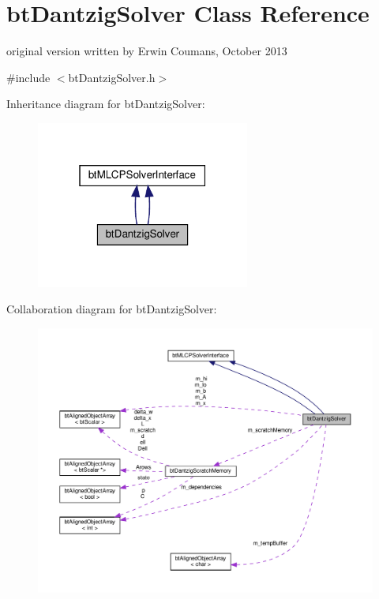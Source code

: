 \hypertarget{classbtDantzigSolver}{}\section{bt\+Dantzig\+Solver Class Reference}
\label{classbtDantzigSolver}


original version written by Erwin Coumans, October 2013  




{\ttfamily \#include $<$bt\+Dantzig\+Solver.\+h$>$}



Inheritance diagram for bt\+Dantzig\+Solver\+:
\nopagebreak
\begin{figure}[H]
\begin{center}
\leavevmode
\includegraphics[width=199pt]{classbtDantzigSolver__inherit__graph}
\end{center}
\end{figure}


Collaboration diagram for bt\+Dantzig\+Solver\+:
\nopagebreak
\begin{figure}[H]
\begin{center}
\leavevmode
\includegraphics[width=350pt]{classbtDantzigSolver__coll__graph}
\end{center}
\end{figure}
